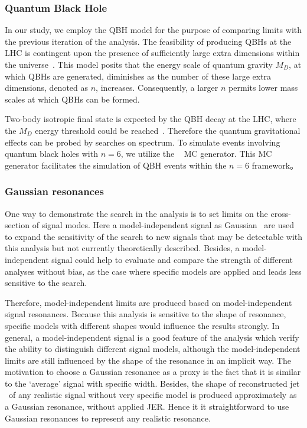 \subsubsection{Quantum Black Hole}
In our study, we employ the QBH model for the purpose of comparing limits with the previous iteration of the analysis. The feasibility of producing QBHs at the LHC is contingent upon the presence of sufficiently large extra dimensions within the universe~\cite{RandallMeade}. This model posits that the energy scale of quantum gravity $M_{D}$, at which QBHs are generated, diminishes as the number of these large extra dimensions, denoted as $n$, increases. Consequently, a larger $n$ permits lower mass scales at which QBHs can be formed.

Two-body isotropic final state is expected by the QBH decay at the LHC, where the $M_D$ energy threshold could be reached~\cite{Feng:2004}. Therefore the quantum gravitational effects can be probed by searches on \mjj spectrum. To simulate events involving quantum black holes with $n=6$, we utilize the \BlackMax~\cite{Dai:2007ki} MC generator. This MC generator facilitates the simulation of QBH events within the $n=6$ framework。

\subsubsection{Gaussian resonances}

One way to demonstrate the search in the analysis is to set limits on the cross-section of signal modes. Here a model-independent signal as Gaussian~\cite{lukacs1942characterization} are used to expand the sensitivity of the search to new signals that may be detectable with this analysis but not currently theoretically described. Besides, a model-independent signal could help to evaluate and compare the strength of different analyses without bias, as the case where specific models are applied and leads less sensitive to the search.

Therefore, model-independent limits are produced based on model-independent signal resonances. Because this analysis is sensitive to the shape of resonance, specific models with different shapes would influence the results strongly. In general, a model-independent signal is a good feature of the analysis which verify the ability to distinguish different signal models, although the model-independent limits are still influenced by the shape of the resonance in an implicit way. The motivation to choose a Gaussian resonance as a proxy is the fact that it is similar to the `average' signal with specific width. Besides, the shape of reconstructed jet \pt~of any realistic signal without very specific model is produced approximately as a Gaussian resonance, without applied JER. Hence it it straightforward to use Gaussian resonances to represent any realistic resonance.

